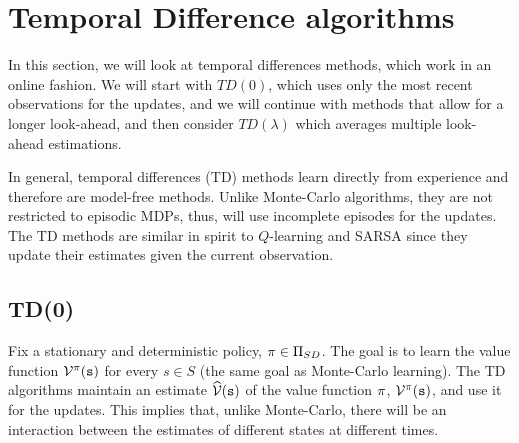 \section{Temporal Difference algorithms}
\label{sec:TD}



In this section, we will look at temporal differences methods, which
work in an online fashion. We will start with $TD(0)$, which uses
only the most recent observations for the updates, and we will
continue with methods that allow for a longer look-ahead, and then
consider $TD(\lambda)$ which averages multiple look-ahead
estimations.

In general, temporal differences (TD) methods learn directly from
experience and therefore are model-free methods. Unlike Monte-Carlo
algorithms, they are not restricted to episodic MDPs, thus,
will use incomplete episodes for the updates.
The TD methods are similar in spirit to $Q$-learning and SARSA since
they update their estimates given the current observation.

\subsection{TD(0)}
Fix a stationary and deterministic policy, $\pi\in \Pi_{SD}$. 
The goal is to learn the value function $\mathcal{V}^\pi({\tt s})$ for every
$s\in S$ (the same goal as Monte-Carlo learning). The TD algorithms
maintain an estimate $\widehat{\mathcal{V}}({\tt s})$ of the value function
$\pi$, $\mathcal{V}^\pi({\tt s})$, and use it for the updates. 
This implies that, unlike Monte-Carlo, there will be an interaction between the estimates of
different states at different times.

